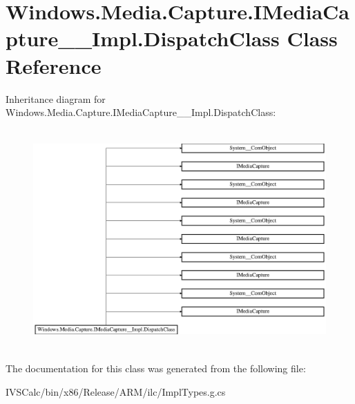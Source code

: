 \hypertarget{class_windows_1_1_media_1_1_capture_1_1_i_media_capture_____impl_1_1_dispatch_class}{}\section{Windows.\+Media.\+Capture.\+I\+Media\+Capture\+\_\+\+\_\+\+Impl.\+Dispatch\+Class Class Reference}
\label{class_windows_1_1_media_1_1_capture_1_1_i_media_capture_____impl_1_1_dispatch_class}
Inheritance diagram for Windows.\+Media.\+Capture.\+I\+Media\+Capture\+\_\+\+\_\+\+Impl.\+Dispatch\+Class\+:\begin{figure}[H]
\begin{center}
\leavevmode
\includegraphics[height=8.438356cm]{class_windows_1_1_media_1_1_capture_1_1_i_media_capture_____impl_1_1_dispatch_class}
\end{center}
\end{figure}


The documentation for this class was generated from the following file\+:\begin{DoxyCompactItemize}
\item 
I\+V\+S\+Calc/bin/x86/\+Release/\+A\+R\+M/ilc/Impl\+Types.\+g.\+cs\end{DoxyCompactItemize}
